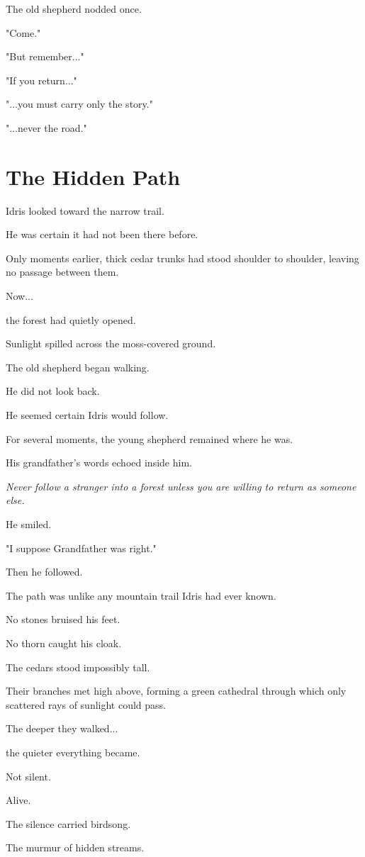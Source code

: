 \documentclass[12pt,openany]{book}
\begin{document}
The old shepherd nodded once.

"Come."

"But remember..."

"If you return..."

"...you must carry only the story."

"...never the road."
\section*{The Hidden Path}

Idris looked toward the narrow trail.

He was certain it had not been there before.

Only moments earlier, thick cedar trunks had stood shoulder to shoulder, leaving no passage between them.

Now...

the forest had quietly opened.

Sunlight spilled across the moss-covered ground.

The old shepherd began walking.

He did not look back.

He seemed certain Idris would follow.

For several moments, the young shepherd remained where he was.

His grandfather's words echoed inside him.

\emph{Never follow a stranger into a forest unless you are willing to return as someone else.}

He smiled.

"I suppose Grandfather was right."

Then he followed.

The path was unlike any mountain trail Idris had ever known.

No stones bruised his feet.

No thorn caught his cloak.

The cedars stood impossibly tall.

Their branches met high above, forming a green cathedral through which only scattered rays of sunlight could pass.

The deeper they walked...

the quieter everything became.

Not silent.

Alive.

The silence carried birdsong.

The murmur of hidden streams.
\end{document}
